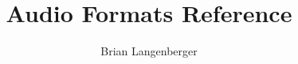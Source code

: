 \documentclass[letterpaper]{scrbook}
\title{Audio Formats Reference}
\author{Brian Langenberger}
\begin{document}
\maketitle
\tableofcontents

\begin{appendices}


\end{appendices}
\end{document}
